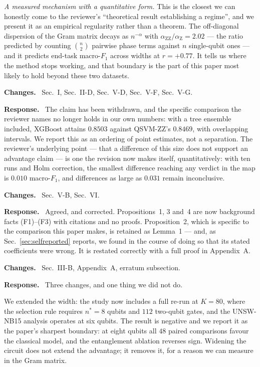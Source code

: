 \documentclass[11pt,a4paper]{article}
\newcommand{\itemhead}[2]{%
  \par\addvspace{15pt}%
  \noindent{\bfseries\color{tagink}#1}\hspace{0.7em}{\bfseries #2}%
  \par\addvspace{3.5pt}%
  \noindent{\color{rulegray}\rule{\linewidth}{0.5pt}}%
  \par\addvspace{5pt}%
  \nobreak}
\newcommand{\resp}{\par\addvspace{2pt}\noindent\textbf{Response.}\ }
\newcommand{\changed}{\par\addvspace{5pt}\noindent
  {\bfseries\color{tagink}Changes.}\ }
\begin{document}
\emph{A measured mechanism with a quantitative form.} This is the closest we can
honestly come to the reviewer's ``theoretical result establishing a regime'',
and we present it as an empirical regularity rather than a theorem. The
off-diagonal dispersion of the Gram matrix decays as $n^{-\alpha}$ with
$\alpha_{\mathrm{ZZ}}/\alpha_{\mathrm{Z}}=2.02$ --- the ratio predicted by
counting $\binom{n}{2}$ pairwise phase terms against $n$ single-qubit ones ---
and it predicts end-task macro-$F_1$ across widths at $r=+0.77$. It tells us
where the method stops working, and that boundary is the part of this paper most
likely to hold beyond these two datasets.
\changed
Sec.~I, Sec.~II-D, Sec.~V-D, Sec.~V-F, Sec.~V-G.

\itemhead{R3-2}{The advantage rests on a marginal improvement ($0.854$ vs
$0.838$)}
\resp
The claim has been withdrawn, and the specific comparison the reviewer names no
longer holds in our own numbers: with a tree ensemble included, XGBoost attains
$0.8503$ against QSVM-ZZ's $0.8469$, with overlapping intervals. We report this
as an ordering of point estimates, not a separation. The reviewer's underlying
point --- that a difference of this size does not support an advantage claim ---
is one the revision now makes itself, quantitatively: with ten runs and Holm
correction, the smallest difference reaching any verdict in the map is $0.010$
macro-$F_1$, and differences as large as $0.031$ remain inconclusive.
\changed
Sec.~V-B, Sec.~VI.

\itemhead{R3-3}{The propositions are well-established facts and their framing as
proved propositions is inappropriate}
\resp
Agreed, and corrected. Propositions~1, 3 and~4 are now background facts
(F1)--(F3) with citations and no proofs. Proposition~2, which is specific to the
comparison this paper makes, is retained as Lemma~1 --- and, as
Sec.~\ref{sec:selfreported} reports, we found in the course of doing so that its
stated coefficients were wrong. It is restated correctly with a full proof in
Appendix~A.
\changed
Sec.~III-B, Appendix~A, erratum subsection.

\itemhead{R3-4}{All experiments use very few qubits and small data, yet are
framed as NISQ-aware}
\resp
Three changes, and one thing we did not do.

We extended the width: the study now includes a full re-run at $K=80$, where the
selection rule requires $n^{\ast}=8$ qubits and $112$ two-qubit gates, and the
UNSW-NB15 analysis operates at six qubits. The result is negative and we report
it as the paper's sharpest boundary: at eight qubits all $48$ paired comparisons
favour the classical model, and the entanglement ablation reverses sign. Widening
the circuit does not extend the advantage; it removes it, for a reason we can
measure in the Gram matrix.
\end{document}
